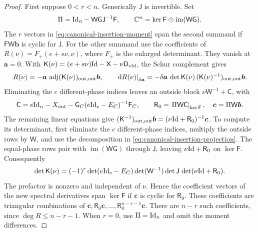 \begin{proof}
First suppose $0<r<n$. Generically $\mathsf J$ is invertible. Set
\begin{equation}\label{eq:canonical-insertion-projection}
 \Pi=\mathrm{Id}_n-\mathsf W \mathsf G \mathsf J^{-1}\mathsf F,\qquad
 \mathbb C^n=\ker \mathsf F\oplus\operatorname{im}(\mathsf W \mathsf G).
\end{equation}
The $r$ vectors in \cref{eq:canonical-insertion-moment} span the
second summand if $\mathsf F\mathsf W \boldsymbol b$ is cyclic for $\mathsf J$.
For the other summand use the coefficients of
$R(\nu)=F_+(e+s\nu,\nu)$, where $F_+$ is the enlarged determinant.
They vanish at $\boldsymbol a=0$. With
$\mathsf K(\nu)=(e+s\nu)\mathrm{Id}-\mathsf X-\nu\mathsf D_{\rm old}$,
the Schur complement gives
\[
 R(\nu)=-\boldsymbol a\,
       \operatorname{adj}(\mathsf K(\nu))_{\rm out,out}\boldsymbol b,
 \qquad
 \left.\mathrm dR(\nu)\right|_{\delta \boldsymbol a}
 =-\delta \boldsymbol a\,\det \mathsf K(\nu)\,
            (\mathsf K(\nu)^{-1})_{\rm out,out}\boldsymbol b.
\]
Eliminating the $c$ different-phase indices leaves an outside block
$\nu\mathsf W^{-1}+\mathsf C$, with
\[
 \mathsf C=e\mathrm{Id}_n-X_{\rm out}-\mathsf G_C(e\mathrm{Id}_c-E_C)^{-1}\mathsf F_C,\qquad
 \mathsf R_0=\left.\Pi\mathsf W \mathsf C\right|_{\ker \mathsf F},\quad \boldsymbol c=\Pi\mathsf W \boldsymbol b.
\]
The remaining linear equations give
$(\mathsf K^{-1})_{\rm out,out}\boldsymbol b=(\nu\mathrm{Id}+\mathsf R_0)^{-1}\boldsymbol c$.
To compute its determinant, first eliminate the $c$ different-phase
indices, multiply the outside rows by $\mathsf W$, and use the
decomposition in \cref{eq:canonical-insertion-projection}. The
equal-phase rows pair with $\operatorname{im}(\mathsf W\mathsf G)$
through $\mathsf J$, leaving $\nu\mathrm{Id}+\mathsf R_0$ on $\ker\mathsf F$.
Consequently
\[
 \det\mathsf K(\nu)
 =(-1)^r\det(e\mathrm{Id}_c-E_C)\det(\mathsf W^{-1})\det\mathsf J\,
       \det(\nu\mathrm{Id}+\mathsf R_0).
\]
The prefactor is nonzero and independent of $\nu$.
Hence the coefficient vectors of the new spectral
derivatives span $\ker \mathsf F$ if $\boldsymbol c$ is cyclic for $\mathsf R_0$.
These coefficients are triangular combinations of
$\boldsymbol c,\mathsf R_0\boldsymbol c,\ldots,\mathsf R_0^{n-r-1}\boldsymbol c$.
There are $n-r$ such coefficients, since $\deg R\leq n-r-1$.
When $r=0$, use $\Pi=\mathrm{Id}_n$ and omit the moment differences.


\end{proof}
